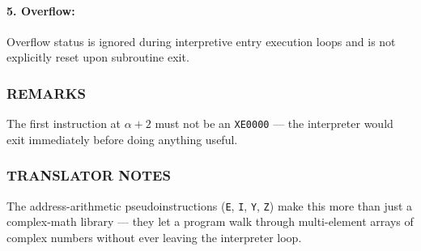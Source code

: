 \paragraph{5. Overflow:}
Overflow status is ignored during interpretive entry execution loops and is not explicitly reset upon subroutine exit.

\subsubsection*{REMARKS}
The first instruction at $\alpha+2$ must not be an \texttt{XE0000} --- the interpreter would exit immediately before doing anything useful.

\subsubsection*{TRANSLATOR NOTES}
The address-arithmetic pseudoinstructions (\texttt{E}, \texttt{I}, \texttt{Y}, \texttt{Z}) make this more than just a complex-math library --- they let a program walk through multi-element arrays of complex numbers without ever leaving the interpreter loop.
\newpage

